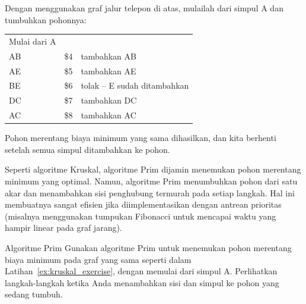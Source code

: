 \begin{example}{} %
Dengan menggunakan graf jalur telepon di atas, mulailah dari simpul A dan tumbuhkan pohonnya:\\
\begin{minipage}{.54\textwidth}
\begin{tabular}{lll}
Mulai dari A&&\\
AB&	\$4&	tambahkan AB\\
AE	&\$5	&tambahkan AE\\
BE	&\$6&	tolak -- E sudah ditambahkan\\
DC	&\$7&	tambahkan DC\\
AC&\$8&	tambahkan AC\\
\end{tabular}
\end{minipage}
%
\begin{minipage}{.45\textwidth}
\end{minipage}

Pohon merentang biaya minimum yang sama dihasilkan, dan kita berhenti setelah semua simpul ditambahkan ke pohon.
\end{example}

Seperti algoritme Kruskal, algoritme Prim dijamin menemukan pohon merentang minimum yang optimal. Namun, algoritme Prim menumbuhkan pohon dari satu akar dan menambahkan sisi penghubung termurah pada setiap langkah. Hal ini membuatnya sangat efisien jika diimplementasikan dengan antrean prioritas (misalnya menggunakan tumpukan Fibonacci untuk mencapai waktu yang hampir linear pada graf jarang).

\begin{ex}{Algoritme Prim}{}\label{ex:prim_exercise}
Gunakan algoritme Prim untuk menemukan pohon merentang biaya minimum pada graf yang sama seperti dalam Latihan~\ref{ex:kruskal_exercise}, dengan memulai dari simpul A. Perlihatkan langkah-langkah ketika Anda menambahkan sisi dan simpul ke pohon yang sedang tumbuh.
\end{ex}

